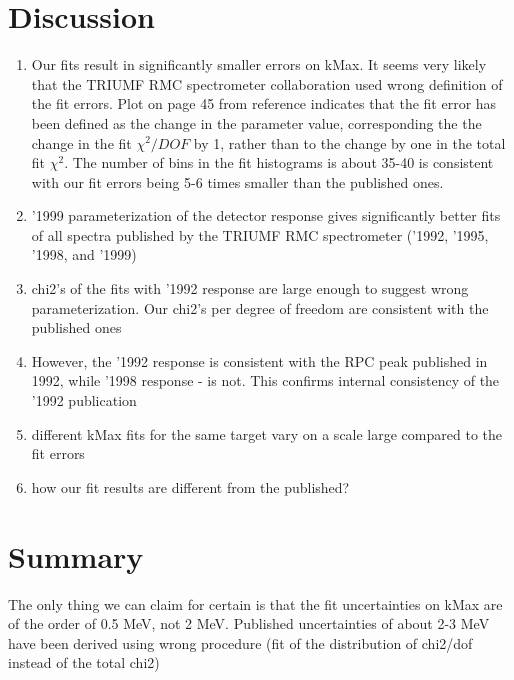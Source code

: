 \documentclass[12pt]{article}
\begin{document}


% 
\section { Discussion }

\begin{enumerate}
\item
  Our fits result in significantly smaller errors on kMax. It seems very likely
  that the TRIUMF RMC spectrometer collaboration used wrong definition of the
  fit errors. Plot on page 45 from reference \cite{BERGBISH_MS_THESIS} indicates
  that the fit error has been defined as the change in the parameter value,
  corresponding the the change in the fit $\chi^2/DOF$ by 1, rather than to the change
  by one in the total fit $\chi^2$. The number of bins in the fit histograms
  is about 35-40 is consistent with our fit errors being 5-6 times smaller than
  the published ones.
\item
  '1999 parameterization of the detector response gives significantly better
  fits of all spectra published by the TRIUMF RMC spectrometer 
  ('1992, '1995, '1998, and '1999)
\item
  chi2's of the fits with '1992 response are large enough to suggest wrong
  parameterization. Our chi2's per degree of freedom are consistent with
  the published ones
\item
  However, the '1992 response is consistent with the RPC peak published
  in 1992, while '1998 response - is not. This confirms internal consistency
  of the '1992 publication 
\item
  different kMax fits for the same target vary on a scale large compared
  to the fit errors
\item
  how our fit results are different from the published? 
\end{enumerate}

\section{ Summary }


The only thing we can claim for certain is that the fit uncertainties on kMax are
of the order of 0.5 MeV, not 2 MeV. Published uncertainties of about 2-3 MeV
have been derived using wrong procedure (fit of the distribution of chi2/dof
instead of the total chi2)
\end{document}
